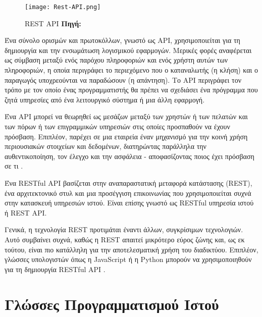 \begin{figure}[h]
	\centering
	\texttt{[image: Rest-API.png]}
	\caption[{REST API}]{REST API \textbf{Πηγή:} \parencite{fig_Rest_API}}
	\label{fig:rest_api}
\end{figure}

Ένα σύνολο ορισμών και πρωτοκόλλων, γνωστό ως API, χρησιμοποιείται για τη δημιουργία και την ενσωμάτωση λογισμικού εφαρμογών. Μερικές φορές αναφέρεται ως σύμβαση μεταξύ ενός παρόχου πληροφοριών και ενός χρήστη αυτών των πληροφοριών, η οποία περιγράφει το περιεχόμενο που ο καταναλωτής (η κλήση) και ο παραγωγός υποχρεούνται να παραδώσουν (η απάντηση). Το API περιγράφει τον τρόπο με τον οποίο ένας προγραμματιστής θα πρέπει να σχεδιάσει ένα πρόγραμμα που ζητά υπηρεσίες από ένα λειτουργικό σύστημα ή μια άλλη εφαρμογή. 

Ένα API μπορεί να θεωρηθεί ως μεσάζων μεταξύ των χρηστών ή των πελατών και των πόρων ή των επιγραμμικών υπηρεσιών στις οποίες προσπαθούν να έχουν πρόσβαση. Επιπλέον, παρέχει σε μια εταιρεία έναν μηχανισμό για την κοινή χρήση περιουσιακών στοιχείων και δεδομένων, διατηρώντας παράλληλα την αυθεντικοποίηση, τον έλεγχο και την ασφάλεια - αποφασίζοντας ποιος έχει πρόσβαση σε τι \cite{RedHat_2020}. 

Ένα RESTful API βασίζεται στην αναπαραστατική μεταφορά κατάστασης (REST), ένα αρχιτεκτονικό στυλ και μια προσέγγιση επικοινωνίας που χρησιμοποιείται συχνά στην κατασκευή υπηρεσιών ιστού. Είναι επίσης γνωστό ως RESTful υπηρεσία ιστού ή REST API.

Γενικά, η τεχνολογία REST προτιμάται έναντι άλλων, συγκρίσιμων τεχνολογιών. Αυτό συμβαίνει συχνά, καθώς η REST απαιτεί μικρότερο εύρος ζώνης και, ως εκ τούτου, είναι πιο κατάλληλη για την αποτελεσματική χρήση του διαδικτύου. Επιπλέον, γλώσσες υπολογιστών όπως η JavaScript ή η Python μπορούν να χρησιμοποιηθούν για τη δημιουργία RESTful API \cite{Gillis_2020}.

\section{Γλώσσες Προγραμματισμού Ιστού}

